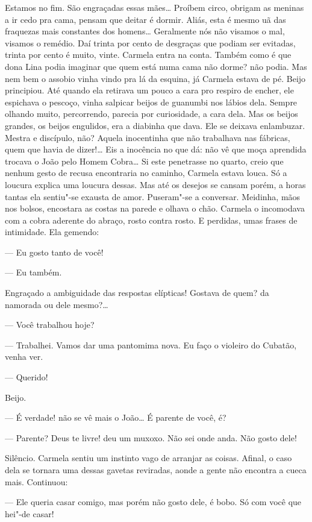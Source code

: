 Estamos no fim. São engraçadas essas mães\ldots{} Proíbem circo, obrigam as
meninas a ir cedo pra cama, pensam que deitar é dormir. Aliás, esta é
mesmo uã das fraquezas mais constantes dos homens\ldots{} Geralmente nós não
visamos o mal, visamos o remédio. Daí trinta por cento de desgraças que
podiam ser evitadas, trinta por cento é muito, vinte. Carmela entra na
conta. Também como é que dona Lina podia imaginar que quem está numa
cama não dorme? não podia. Mas nem bem o assobio vinha vindo pra lá da
esquina, já Carmela estava de pé. Beijo principiou. Até quando ela
retirava um pouco a cara pro respiro de encher, ele espichava o pescoço,
vinha salpicar beijos de guanumbi nos lábios dela. Sempre olhando muito,
percorrendo, parecia por curiosidade, a cara dela. Mas os beijos
grandes, os beijos engulidos, era a diabinha que dava. Ele se deixava
enlambuzar. Mestra e discípulo, não? Aquela inocentinha que não
trabalhava nas fábricas, quem que havia de dizer!\ldots{} Eis a inocência no
que dá: não vê que moça aprendida trocava o João pelo Homem Cobra\ldots{} Si
este penetrasse no quarto, creio que nenhum gesto de recusa encontraria
no caminho, Carmela estava louca. Só a loucura explica uma loucura
dessas. Mas até os desejos se cansam porém, a horas tantas ela sentiu"-se
exausta de amor. Puseram"-se a conversar. Meidinha, mãos nos bolsos,
encostara as costas na parede e olhava o chão. Carmela o incomodava com
a cobra aderente do abraço, rosto contra rosto. E perdidas, umas frases
de intimidade. Ela gemendo:

--- Eu gosto tanto de você!

--- Eu também.

Engraçado a ambiguidade das respostas elípticas! Gostava de quem? da
namorada ou dele mesmo?\ldots{}

--- Você trabalhou hoje?

--- Trabalhei. Vamos dar uma pantomima nova. Eu faço o violeiro do
Cubatão, venha ver.

--- Querido!

Beijo.

--- É verdade! não se vê mais o João\ldots{} É parente de você, é?

--- Parente? Deus te livre! deu um muxoxo. Não sei onde anda. Não gosto
dele!

Silêncio. Carmela sentiu um instinto vago de arranjar as coisas. Afinal,
o caso dela se tornara uma dessas gavetas reviradas, aonde a gente não
encontra a cueca mais. Continuou:

--- Ele queria casar comigo, mas porém não gosto dele, é bobo. Só com
você que hei"-de casar!

